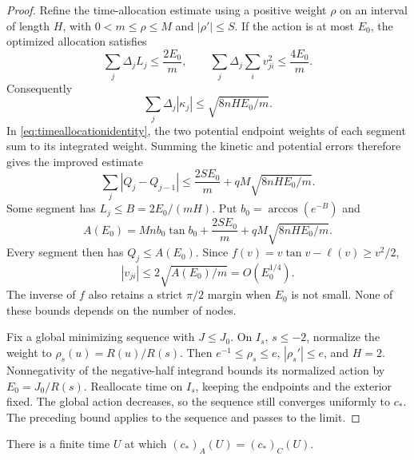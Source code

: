 \begin{proof}
Refine the time-allocation estimate using a positive weight $\rho$
on an interval of length $H$, with
$0<m\le\rho\le M$ and $|\rho'|\le S$. If the action is at most
$E_0$, the optimized allocation satisfies
\[
 \sum_j\Delta_jL_j\le\frac{2E_0}{m},\qquad
 \sum_j\Delta_j\sum_i v_{ji}^2\le\frac{4E_0}{m}.
\]
Consequently
\[
 \sum_j\Delta_j|\kappa_j|\le\sqrt{8nHE_0/m}.
\]
In \eqref{eq:timeallocationidentity}, the two potential endpoint
weights of each segment sum to its integrated weight. Summing the
kinetic and potential errors therefore gives the improved estimate
\[
 \sum_j|Q_j-Q_{j-1}|
 \le\frac{2SE_0}{m}+qM\sqrt{8nHE_0/m}.
\]
Some segment has $L_j\le B=2E_0/(mH)$. Put
$b_0=\arccos(e^{-B})$ and
\[
 A(E_0)=Mn b_0\tan b_0+\frac{2SE_0}{m}
                         +qM\sqrt{8nHE_0/m}.
\]
Every segment then has $Q_j\le A(E_0)$. Since
$f(v)=v\tan v-\ell(v)\ge v^2/2$,
\[
 |v_{ji}|\le2\sqrt{A(E_0)/m}=O(E_0^{1/4}).
\]
The inverse of $f$ also retains a strict $\pi/2$ margin when
$E_0$ is not small. None of these bounds depends on the number of
nodes.

Fix a global minimizing sequence with $J\le J_0$. On $I_s$,
$s\le-2$, normalize the weight to $\rho_s(u)=R(u)/R(s)$.
Then $e^{-1}\le\rho_s\le e$, $|\rho_s'|\le e$, and
$H=2$. Nonnegativity of the negative-half integrand bounds its
normalized action by $E_0=J_0/R(s)$. Reallocate time on $I_s$,
keeping the endpoints and the exterior fixed. The global action
decreases, so the sequence still converges uniformly to $c_*$.
The preceding bound applies to the sequence and passes to the
limit.
\end{proof}

\begin{proposition}\label{prop:fullcontact}
There is a finite time $U$ at which $(c_*)_A(U)=(c_*)_C(U)$.
\end{proposition}

